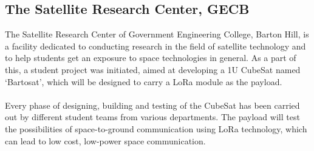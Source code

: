 \subsection{The Satellite Research Center, GECB}
\justifying
  The Satellite Research Center of Government Engineering College, Barton Hill, is a facility dedicated to conducting research in the field of satellite technology and to help students get an exposure to space technologies in general. As a part of this, a student project was initiated, aimed at developing a 1U CubeSat named ‘Bartosat’, which will be designed to carry a LoRa module as the payload. 
 \\ \\
   Every phase of designing, building and testing of the CubeSat has been carried out by different student teams from various departments. The payload will test the possibilities of space-to-ground communication using LoRa technology, which can lead to low cost, low-power space communication.
 \\

